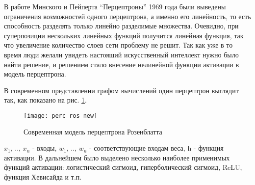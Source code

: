 \par
В работе Минского и Пейперта “Перцептроны” 1969 года были выведены ограничения возможностей одного перцептрона, а именно его линейность, то есть способность разделять только линейно разделимые множества. Очевидно, при суперпозиции нескольких линейных функций получится линейная функция, так что увеличение количество слоев сети проблему не решит. Так как уже в то время люди желали увидеть настоящий искусственный интеллект нужно было найти решение, и решением стало внесение нелинейной функции активации в модель перцептрона.
\par
В современном представлении графом вычислений один перцептрон выглядит так, как показано на рис. \ref{hist:rosnew}.
\begin{figure}[H]
	\centering
	\texttt{[image: perc\_ros\_new]}
	\caption{Современная модель перцептрона Розенблатта}
	\label{hist:rosnew}
\end{figure}
$x_1$, .., $x_n$ - входы, $w_1$, .., $w_n$ - соответствующие входам веса, h - функция активации. В дальнейшем было выделено несколько наиболее применимых функций активации: логистический сигмоид, гиперболический сигмоид, ReLU, функция Хевисайда и т.п.
